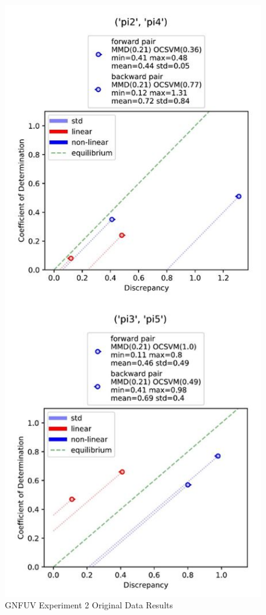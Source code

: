 \documentclass{mpaper}
\begin{document}
\begin{figure}
    \begin{center}
        \includegraphics[scale = 0.6]{experiment_2.jpg}
    \end{center}
    \caption{GNFUV Experiment 2 Original Data Results}
    \label{fig:gnfuv_exp2}
\end{figure}
\end{document}
